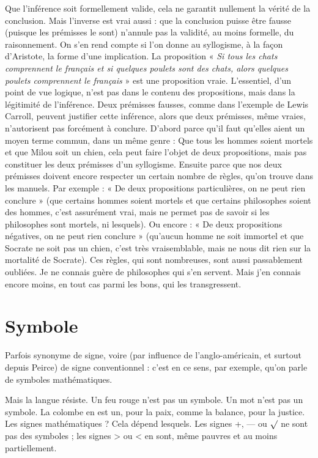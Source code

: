 Que l’inférence soit formellement valide, cela ne garantit nullement la
vérité de la conclusion. Mais l’inverse est vrai aussi : que la conclusion puisse
être fausse (puisque les prémisses le sont) n’annule pas la validité, au moins formelle,
du raisonnement. On s’en rend compte si l’on donne au syllogisme, à la
façon d’Aristote, la forme d’une implication. La proposition « {\it Si tous les chats
comprennent le français et si quelques poulets sont des chats, alors quelques poulets
comprennent le français} » est une proposition vraie. L'essentiel, d’un point de
vue logique, n’est pas dans le contenu des propositions, mais dans la légitimité
de l’inférence. Deux prémisses fausses, comme dans l'exemple de Lewis Carroll,
peuvent justifier cette inférence, alors que deux prémisses, même vraies, n’autorisent
pas forcément à conclure. D’abord parce qu’il faut qu’elles aient un
moyen terme commun, dans un même genre : Que tous les hommes soient
mortels et que Milou soit un chien, cela peut faire l’objet de deux propositions,
mais pas constituer les deux prémisses d’un syllogisme. Ensuite parce que nos
deux prémisses doivent encore respecter un certain nombre de règles, qu’on
trouve dans les manuels. Par exemple : « De deux propositions particulières, on
ne peut rien conclure » (que certains hommes soient mortels et que certains
philosophes soient des hommes, c’est assurément vrai, mais ne permet pas de
savoir si les philosophes sont mortels, ni lesquels). Ou encore : « De deux propositions
négatives, on ne peut rien conclure » (qu'aucun homme ne soit
immortel et que Socrate ne soit pas un chien, c’est très vraisemblable, mais ne
nous dit rien sur la mortalité de Socrate). Ces règles, qui sont nombreuses, sont
aussi passablement oubliées. Je ne connais guère de philosophes qui s’en servent.
Mais j’en connais encore moins, en tout cas parmi les bons, qui les transgressent.

\section{Symbole}
Parfois synonyme de signe, voire (par influence de l’anglo-américain,
et surtout depuis Peirce) de signe conventionnel : c’est en
ce sens, par exemple, qu’on parle de symboles mathématiques.

Mais la langue résiste. Un feu rouge n’est pas un symbole. Un mot n’est pas
un symbole. La colombe en est un, pour la paix, comme la balance, pour la justice.
Les signes mathématiques ? Cela dépend lesquels. Les signes +, — ou $\surd$ ne
sont pas des symboles ; les signes > ou < en sont, même pauvres et au moins
partiellement.

